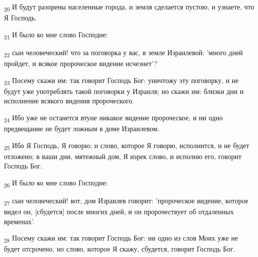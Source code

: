 \begin{tcolorbox}
\textsubscript{20} И будут разорены населенные города, и земля сделается пустою, и узнаете, что Я Господь.
\end{tcolorbox}
\begin{tcolorbox}
\textsubscript{21} И было ко мне слово Господне:
\end{tcolorbox}
\begin{tcolorbox}
\textsubscript{22} сын человеческий! что за поговорка у вас, в земле Израилевой: 'много дней пройдет, и всякое пророческое видение исчезнет'?
\end{tcolorbox}
\begin{tcolorbox}
\textsubscript{23} Посему скажи им: так говорит Господь Бог: уничтожу эту поговорку, и не будут уже употреблять такой поговорки у Израиля; но скажи им: близки дни и исполнение всякого видения пророческого.
\end{tcolorbox}
\begin{tcolorbox}
\textsubscript{24} Ибо уже не останется втуне никакое видение пророческое, и ни одно предвещание не будет ложным в доме Израилевом.
\end{tcolorbox}
\begin{tcolorbox}
\textsubscript{25} Ибо Я Господь, Я говорю; и слово, которое Я говорю, исполнится, и не будет отложено; в ваши дни, мятежный дом, Я изрек слово, и исполню его, говорит Господь Бог.
\end{tcolorbox}
\begin{tcolorbox}
\textsubscript{26} И было ко мне слово Господне:
\end{tcolorbox}
\begin{tcolorbox}
\textsubscript{27} сын человеческий! вот, дом Израилев говорит: 'пророческое видение, которое видел он, [сбудется] после многих дней, и он пророчествует об отдаленных временах'.
\end{tcolorbox}
\begin{tcolorbox}
\textsubscript{28} Посему скажи им: так говорит Господь Бог: ни одно из слов Моих уже не будет отсрочено, но слово, которое Я скажу, сбудется, говорит Господь Бог.
\end{tcolorbox}
